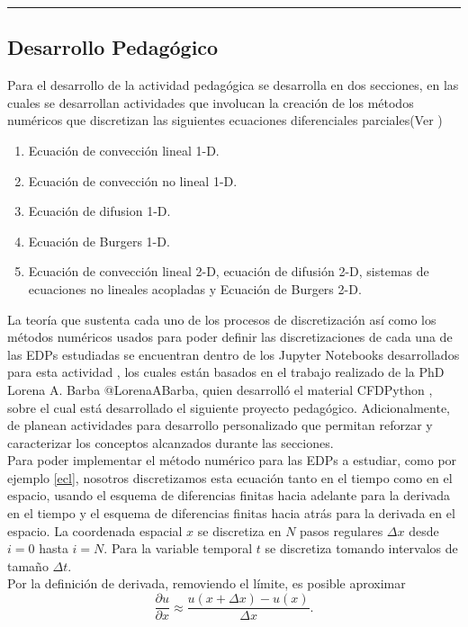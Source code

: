 \documentclass[A4,11pt]{article}
\begin{document}
\begin{center}\rule{0.9\textwidth}{0.1mm}
\end{center}
\begin{multicols}{2}
	
\section{Desarrollo Pedagógico}

Para el desarrollo de la actividad pedagógica se desarrolla en dos secciones, en las cuales se desarrollan actividades que involucan la creación de los métodos numéricos que discretizan las siguientes ecuaciones diferenciales parciales(Ver \cite{LeonardoEC,LeonardoED,LeonardoEDP2d})

\begin{enumerate}
	\item Ecuación de convección lineal 1-D.
	\item Ecuación de convección no lineal 1-D.
	\item Ecuación de difusion 1-D.
	\item Ecuación de Burgers 1-D.
	\item Ecuación de convección lineal 2-D, ecuación de difusión 2-D, sistemas de ecuaciones no lineales acopladas y Ecuación de Burgers 2-D.
\end{enumerate}
La teoría que sustenta cada uno de los procesos de discretización así como los métodos numéricos usados para poder definir las discretizaciones de cada una de las EDPs estudiadas se encuentran dentro de los Jupyter Notebooks desarrollados para esta actividad \cite{LeonardoEC,LeonardoED,LeonardoEDP2d}, los cuales están basados en el trabajo realizado de la PhD Lorena A. Barba @LorenaABarba, quien desarrolló el material CFDPython \cite{Barba,Barbagroup}, sobre el cual está desarrollado el siguiente proyecto pedagógico. Adicionalmente, de planean actividades para desarrollo personalizado que permitan reforzar y caracterizar los conceptos alcanzados durante las secciones. \\

Para poder implementar el método numérico para las EDPs a estudiar, como por ejemplo \ref{ecl}, nosotros discretizamos esta ecuación tanto en el tiempo como en el espacio, usando el esquema de diferencias finitas hacia adelante\cite{Barbagroup,Girault} para la derivada en el tiempo y el esquema de diferencias finitas hacia atrás\cite{Barbagroup,Girault} para la derivada en el espacio. La coordenada espacial $x$ se discretiza en $N$ pasos regulares $\Delta x$ desde $i=0$ hasta $i=N$. Para la variable temporal $t$ se discretiza tomando intervalos de tamaño $\Delta t$.\\
Por la definición de derivada, removiendo el límite, es posible aproximar
$$\frac{\partial u}{\partial x}\approx \frac{u(x+\Delta x)-u(x)}{\Delta x}.$$


\end{multicols}
\end{document}
